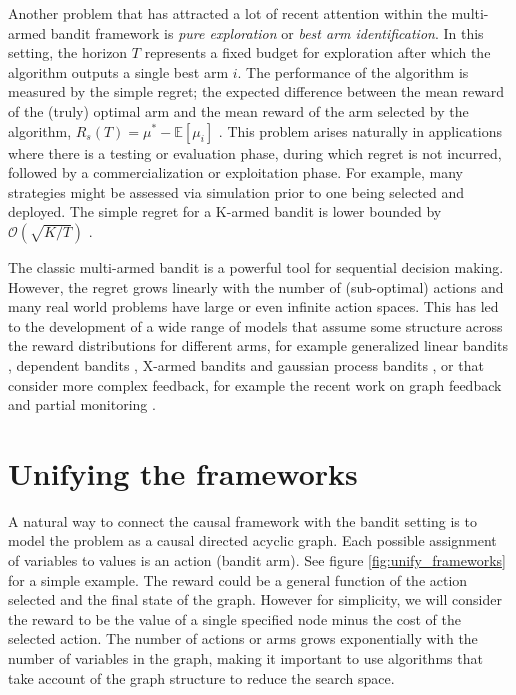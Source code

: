 \documentclass[11pt,a4paper]{article}
\newcommand{\E}[1]{\mathbb E\left[{#1}\right]}
\newcommand{\bigo}[1]{\mathcal{O}\left( #1 \right)}
\begin{document}
Another problem that has attracted a lot of recent attention \cite{Bubeck2009,Audibert2010,Gabillon2012,Karnin2013} within the multi-armed bandit framework is \textit{pure exploration} or \textit{best arm identification}. In this setting, the horizon $T$ represents a fixed budget for exploration after which the algorithm outputs a single best arm $i$. The performance of the algorithm is measured by the simple regret; the expected difference between the mean reward of the (truly) optimal arm and the mean reward of the arm selected by the algorithm, $R_s(T) = \mu^* - \E{\mu_i}$ . This problem arises naturally in applications where there is a testing or evaluation phase, during which regret is not incurred, followed by a commercialization or exploitation phase. For example, many strategies might be assessed via simulation prior to one being selected and deployed. The simple regret for a K-armed bandit is lower bounded by $\bigo{\sqrt{K/T}}$ \cite{Bubeck2009}.


The classic multi-armed bandit is a powerful tool for sequential decision making. However, the regret grows linearly with the number of (sub-optimal) actions and many real world problems have large or even infinite action spaces. This has led to the development of a wide range of models that assume some structure across the reward distributions for different arms, for example generalized linear bandits \cite{filippi2010parametric}, dependent bandits \cite{Pandey2007}, X-armed bandits \cite{Bubeck2010} and gaussian process bandits \cite{srinivas2009gaussian}, or that consider more complex feedback, for example the recent work on graph feedback \cite{Mannor2011,Lelarge2012,Alon2013,Buccapatnam2014,Kocak2014,Alon2015} and partial monitoring \cite{Piccolboni2001,Bartok2014}. 

\section{Unifying the frameworks}

A natural way to connect the causal framework with the bandit setting is to model the problem as a causal directed acyclic graph. Each possible assignment of variables to values is an action (bandit arm). See figure \ref{fig:unify_frameworks} for a simple example. The reward could be a general function of the action selected and the final state of the graph. However for simplicity, we will consider the reward to be the value of a single specified node minus the cost of the selected action. The number of actions or arms grows exponentially with the number of variables in the graph, making it important to use algorithms that take account of the graph structure to reduce the search space. 
\end{document}
